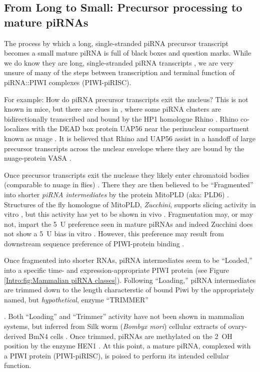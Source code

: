{  \subsection{From Long to Small: Precursor processing to mature piRNAs}
    \label{Intro:subsec:Processing of piRNAs in mice}

    The process by which a long, single-stranded piRNA precursor transcript becomes a small mature piRNA is full of black boxes and question marks. While we do know they are long, single-stranded piRNA transcripts \citep{Brennecke2007,Li2013e}, we are very unsure of many of the steps between transcription and terminal function of piRNA::PIWI complexes (PIWI-piRISC).

    For example: How do piRNA precursor transcripts exit the nucleus? This is not known in mice, but there are clues in \flies{}, where some piRNA clusters are bidirectionally transcribed and bound by the HP1 homologue Rhino \citep{Klattenhoff2009}. Rhino co-localizes with the DEAD box protein UAP56 near the perinuclear compartment known as nuage \citep{Zhang2012}. It is believed that Rhino and UAP56 assist in a handoff of large precursor transcripts across the nuclear envelope where they are bound by the nuage-protein VASA \citep{Zhang2012}.

    Once precursor transcripts exit the nuclease they likely enter chromatoid bodies (comparable to nuage in flies) \citep{Lim2007,Meikar2011,Zhang2012}. There they are then believed to be ``Fragmented'' into shorter \textit{piRNA intermediates} \citep{Saito2010,Li2013} by the protein MitoPLD (aka: PLD6) \citep{Watanabe2011a}. Structures of the fly homologue of MitoPLD, \textit{Zucchini}, supports slicing activity in vitro \citep{Nishimasu2012,Ipsaro2012}, but this activity has yet to be shown in vivo \citep{Luteijn2013}. Fragmentation may, or may not, impart the 5\textprime~U preference seen in mature piRNAs \citep{Gunawardane2007,Brennecke2007} and indeed Zucchini does not show a 5\textprime~U bias in vitro \citep{Nishimasu2012,Ipsaro2012}. However, this preference may result from downstream sequence preference of PIWI-protein binding \citep{Cora2014}.

    Once fragmented into shorter RNAs, piRNA intermediates seem to be ``Loaded,'' into a specific time- and expression-appropriate PIWI protein (see Figure \ref{Intro:fig:Mammalian piRNA classes}). Following ``Loading,'' piRNA intermediates are trimmed down to the length characterstic of bound Piwi by the appropriately named, but \textit{hypothetical}, enzyme ``TRIMMER'' \citep{Kawaoka2011}}. Both ``Loading'' and ``Trimmer'' activity have not been shown in mammalian systems, but inferred from Silk worm (\textit{Bombyx mori}) cellular extracts of ovary-derived BmN4 cells \citep{Kawaoka2009}. Once trimmed, piRNAs are methylated on the 2\textprime~OH position by the enzyme HEN1 \citep{Horwich2007,Kirino2007,Kawaoka2011}. At this point, a mature piRNA, complexed with a PIWI protein (PIWI-piRISC), is poised to perform its intended cellular function.

